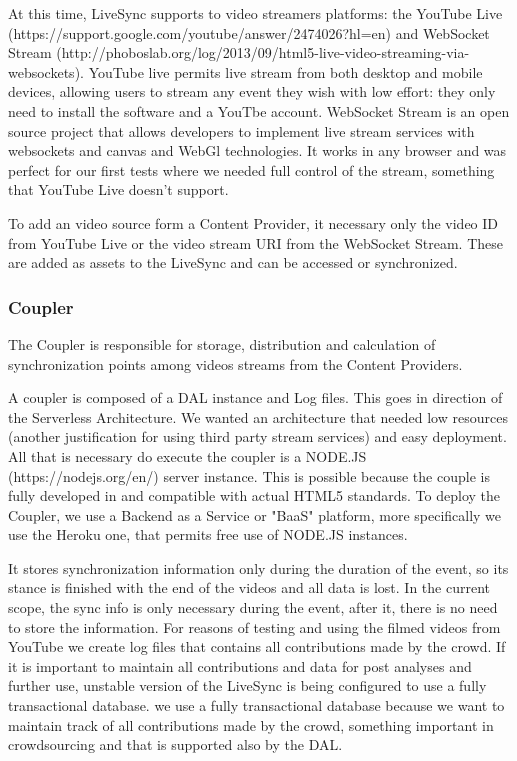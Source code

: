 \documentclass{sig-alternate-05-2015}
\begin{document}
At this time, LiveSync supports to video streamers platforms: the YouTube Live (https://support.google.com/youtube/answer/2474026?hl=en) and WebSocket Stream (http://phoboslab.org/log/2013/09/html5-live-video-streaming-via-websockets). YouTube live permits live stream from both desktop and mobile devices, allowing users to stream any event they wish with low effort: they only need to install the software and a YouTbe account. WebSocket Stream is an open source project that allows developers to implement live stream services with websockets and canvas and WebGl technologies. It works in any browser and was perfect for our first tests where we needed full control of the stream, something that YouTube Live doesn't support.

To add an video source form a Content Provider, it necessary only the video ID from YouTube Live or the video stream URI from the WebSocket Stream. These are added as assets to the LiveSync and can be accessed or synchronized.

\subsubsection{Coupler}
The Coupler is responsible for storage, distribution and calculation of synchronization points among videos streams from the Content Providers.

A coupler is composed of a DAL instance and Log files. This goes in direction of the Serverless Architecture. We wanted an architecture that needed low resources (another justification for using third party stream services) and easy deployment. All that is necessary do execute the coupler is a NODE.JS (https://nodejs.org/en/) server instance. This is possible because the couple is fully developed in  and compatible with actual HTML5 standards. To deploy the Coupler, we use a Backend as a Service or "BaaS" platform, more specifically we use the Heroku one, that permits free use of NODE.JS instances.

It stores synchronization information only during the duration of the event, so its stance is finished with the end of the videos and all data is lost. In the current scope, the sync info is only necessary during the event, after it, there is no need to store the information. For reasons of testing and using the filmed videos from YouTube we create log files that contains all contributions made by the crowd. If it is important to maintain all contributions and data for post analyses and further use, unstable version of the LiveSync is being configured to use a fully transactional database. we use a fully transactional database because we want to maintain track of all contributions made by the crowd, something important in crowdsourcing and that is supported also by the DAL.
\end{document}
